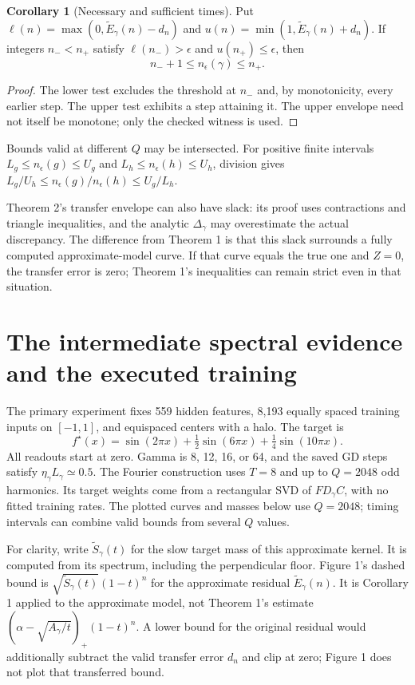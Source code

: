 \documentclass[11pt]{article}
\theoremstyle{definition}
\newtheorem{corollary}{Corollary}
\begin{document}
\begin{corollary}[Necessary and sufficient times]
Put $\ell(n)=\max(0,\widetilde E_\gamma(n)-d_n)$ and
$u(n)=\min(1,\widetilde E_\gamma(n)+d_n)$.
If integers $n_-<n_+$ satisfy $\ell(n_-)>\epsilon$ and $u(n_+)\le\epsilon$,
then
\begin{equation}\label{eq:interval}
 n_-+1\le n_\epsilon(\gamma)\le n_+.
\end{equation}
\end{corollary}
\begin{proof}
The lower test excludes the threshold at $n_-$ and, by monotonicity, every
earlier step. The upper test exhibits a step attaining it. The upper envelope
need not itself be monotone; only the checked witness is used.
\end{proof}
Bounds valid at different $Q$ may be intersected. For positive finite
intervals $L_g\le n_\epsilon(g)\le U_g$ and $L_h\le n_\epsilon(h)\le U_h$,
division gives $L_g/U_h\le n_\epsilon(g)/n_\epsilon(h)\le U_g/L_h$.

Theorem 2's transfer envelope can also have slack: its proof uses contractions
and triangle inequalities, and the analytic $\Delta_\gamma$ may overestimate
the actual discrepancy. The difference from Theorem 1 is that this slack
surrounds a fully computed approximate-model curve. If that curve equals the
true one and $Z=0$, the transfer error is zero; Theorem 1's inequalities can
remain strict even in that situation.

\section{The intermediate spectral evidence and the executed training}
The primary experiment fixes 559 hidden features, 8,193 equally spaced training
inputs on $[-1,1]$, and equispaced centers with a halo. The target is
\begin{equation*}
 f^\star(x)=\sin(2\pi x)+\tfrac12\sin(6\pi x)+\tfrac14\sin(10\pi x).
\end{equation*}
All readouts start at zero. Gamma is 8, 12, 16, or 64, and the saved GD steps
satisfy $\eta_\gamma L_\gamma\simeq0.5$. The Fourier construction uses $T=8$
and up to $Q=2048$ odd harmonics. Its target weights come from a rectangular
SVD of $FD_\gamma C$, with no fitted training rates. The plotted curves and
masses below use $Q=2048$; timing intervals can combine valid bounds from
several $Q$ values.

For clarity, write $\widetilde S_\gamma(t)$ for the slow target mass of this
approximate kernel. It is computed from its spectrum, including the
perpendicular floor. Figure 1's dashed bound is
$\sqrt{\widetilde S_\gamma(t)}(1-t)^n$ for the approximate residual
$\widetilde E_\gamma(n)$. It is Corollary 1 applied to the approximate model,
not Theorem 1's estimate $(\alpha-\sqrt{A_\gamma/t})_+(1-t)^n$.
A lower bound for the original residual would additionally subtract the valid
transfer error $d_n$ and clip at zero; Figure 1 does not plot that transferred
bound.
\end{document}
